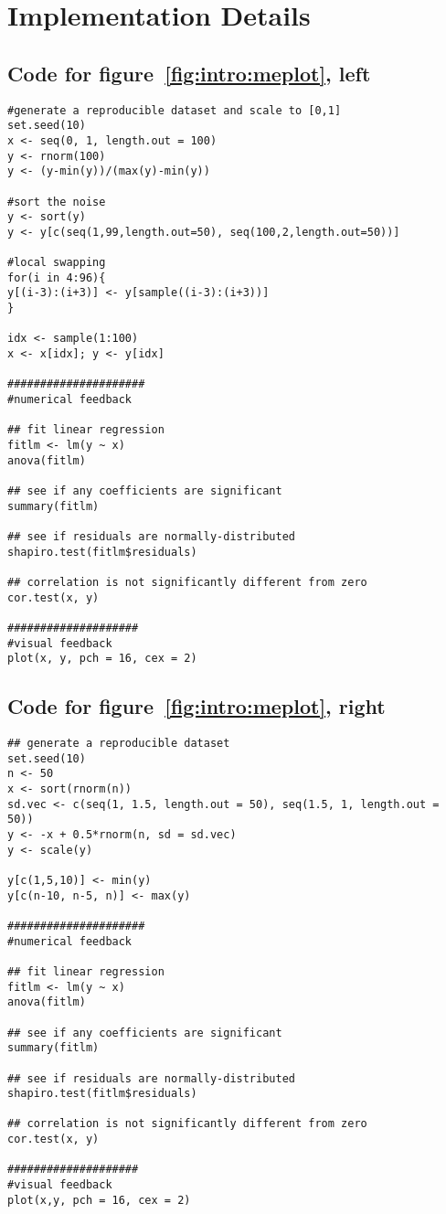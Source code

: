 \chapter{Implementation Details\label{ch:implementation}}

\lstset{basicstyle=\ttfamily,xleftmargin=0.5cm,breaklines=true}


\section{Code for figure~\ref{fig:intro:meplot}, left}
\label{sec:appendicies:me1plot}
{
\begin{lstlisting}
#generate a reproducible dataset and scale to [0,1]
set.seed(10)
x <- seq(0, 1, length.out = 100)
y <- rnorm(100)
y <- (y-min(y))/(max(y)-min(y))

#sort the noise
y <- sort(y)
y <- y[c(seq(1,99,length.out=50), seq(100,2,length.out=50))]

#local swapping
for(i in 4:96){
y[(i-3):(i+3)] <- y[sample((i-3):(i+3))]
}

idx <- sample(1:100)
x <- x[idx]; y <- y[idx]

#####################
#numerical feedback

## fit linear regression
fitlm <- lm(y ~ x)
anova(fitlm)

## see if any coefficients are significant
summary(fitlm)

## see if residuals are normally-distributed
shapiro.test(fitlm$residuals)

## correlation is not significantly different from zero
cor.test(x, y)

####################
#visual feedback
plot(x, y, pch = 16, cex = 2)
\end{lstlisting}
}


\section{Code for figure~\ref{fig:intro:meplot}, right}
\label{sec:appendicies:me2plot}
{
\begin{lstlisting}
## generate a reproducible dataset
set.seed(10)
n <- 50
x <- sort(rnorm(n))
sd.vec <- c(seq(1, 1.5, length.out = 50), seq(1.5, 1, length.out = 50))
y <- -x + 0.5*rnorm(n, sd = sd.vec)
y <- scale(y)

y[c(1,5,10)] <- min(y)
y[c(n-10, n-5, n)] <- max(y)

#####################
#numerical feedback

## fit linear regression
fitlm <- lm(y ~ x)
anova(fitlm)

## see if any coefficients are significant
summary(fitlm)

## see if residuals are normally-distributed
shapiro.test(fitlm$residuals) 

## correlation is not significantly different from zero
cor.test(x, y)

####################
#visual feedback
plot(x,y, pch = 16, cex = 2)
\end{lstlisting}
}


